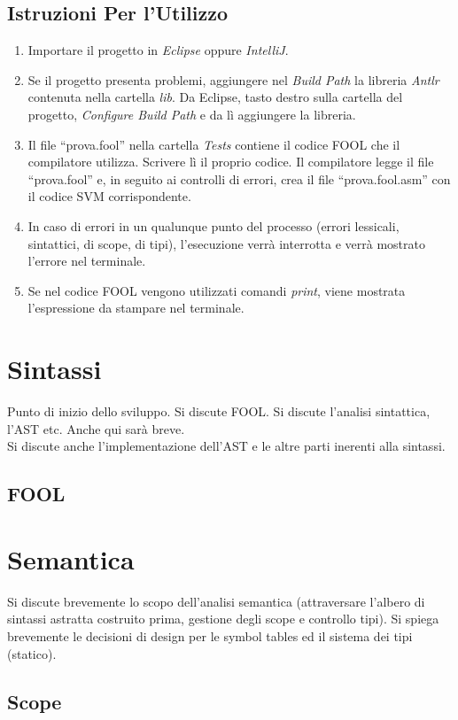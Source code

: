 \documentclass{scrreprt}
\begin{document}
\section{Istruzioni Per l'Utilizzo}
\begin{enumerate}
    \item Importare il progetto in \textit{Eclipse} oppure \textit{IntelliJ}.
    \item Se il progetto presenta problemi, aggiungere nel \textit{Build Path} la libreria \textit{Antlr} contenuta nella cartella \textit{lib}.
        Da Eclipse, tasto destro sulla cartella del progetto, \textit{Configure Build Path} e da lì aggiungere la libreria.
    \item Il file ``prova.fool'' nella cartella \textit{Tests} contiene il codice FOOL che il compilatore utilizza. Scrivere lì il proprio codice. 
        Il compilatore legge il file ``prova.fool'' e, in seguito ai controlli di errori, crea il file ``prova.fool.asm'' con il codice SVM corrispondente.
    \item In caso di errori in un qualunque punto del processo (errori lessicali, sintattici, di scope, di tipi), l'esecuzione verrà interrotta e verrà mostrato l'errore
        nel terminale.
    \item Se nel codice FOOL vengono utilizzati comandi \textit{print}, viene mostrata l'espressione da stampare nel terminale. 
\end{enumerate}

\chapter{Sintassi}
Punto di inizio dello sviluppo. Si discute FOOL.
Si discute l'analisi sintattica, l'AST etc. Anche qui sarà breve.\\
Si discute anche l'implementazione dell'AST e le altre parti inerenti alla sintassi.
\section{FOOL}

\chapter{Semantica}
Si discute brevemente lo scopo dell'analisi semantica (attraversare l'albero di sintassi astratta costruito prima, gestione
degli scope e controllo tipi).
Si spiega brevemente le decisioni di design per le symbol tables ed il sistema dei tipi (statico).
\section{Scope}
\end{document}
